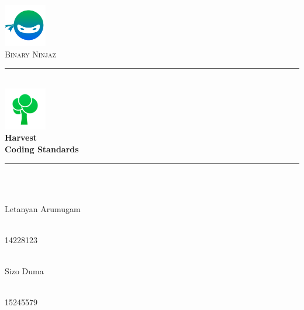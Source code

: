 \documentclass[12pt]{article}
\begin{document}
\begin{titlepage}

	\begin{center}
		\includegraphics[height=5em]{images/Bin.png}\\
		\textsc{\LARGE Binary Ninjaz}\\[0.3cm]
		\rule{\linewidth}{0.5mm} \\[0.5cm]
		\includegraphics[height=5em]{images/Icon.png}\\
		{ \huge \bfseries Harvest \\
		  \vspace{0.3cm}\large \bfseries Coding Standards}\\[0.5cm]
		\rule{\linewidth}{0.5mm} \\[1cm]


		\begin{minipage}{0.4\textwidth}
			\begin{flushleft} \large
				\emph{} \\
				Letanyan {Arumugam}
			\end{flushleft}
		\end{minipage}
		\begin{minipage}{0.4\textwidth}
			\begin{flushright} \large
				\emph{} \\
				14228123
			\end{flushright}
		\end{minipage}

		\begin{minipage}{0.4\textwidth}
			\begin{flushleft} \large
            	\emph{} \\
				Sizo {Duma}
			\end{flushleft}
		\end{minipage}
		\begin{minipage}{0.4\textwidth}
			\begin{flushright} \large
				\emph{} \\
				15245579
			\end{flushright}
		\end{minipage}


\end{center}
\end{titlepage}
\end{document}
